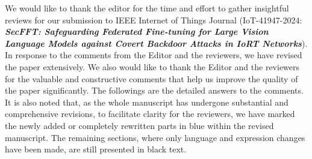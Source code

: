 \documentclass[a4paper,twoside,11pt,dvipsnames]{reviewresponse}
\begin{document}
\thispagestyle{plain}


 {\Large We would like to thank the editor for the time and effort to gather insightful reviews for our submission to IEEE Internet of Things Journal (IoT-41947-2024: \textbf{\textit{ SecFFT: Safeguarding Federated Fine-tuning for Large Vision Language Models against Covert Backdoor Attacks in IoRT Networks}}). In response to the comments from the Editor and the reviewers, we have revised the paper extensively. We also would like to thank the Editor and the reviewers for the valuable and constructive comments that help us improve the quality of the paper significantly. The followings are the detailed answers to the comments. %
 It is also noted that, as the whole manuscript has undergone substantial and comprehensive revisions, to facilitate clarity for the reviewers, we have marked the newly added or completely rewritten parts in {\color{blue}blue\color{black}} within the revised manuscript. The remaining sections, where only language and expression changes have been made, are still presented in black text.
 }


\newpage

\end{document}
